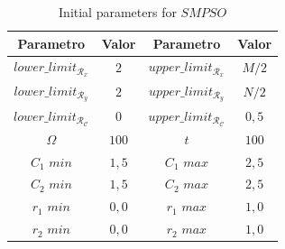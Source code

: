 \documentclass[spanish,twocolumn]{article}
\begin{document}
{%



\begin{table}[h]
\begin{center}
 \begin{tabular}{||c c | c c||} 
 \hline
 Parametro & Valor & Parametro & Valor \\ [0.5ex] 
 \hline\hline
 $lower\_limit_{\mathscr{R}_x}$ & $2$ & $upper\_limit_{\mathscr{R}_x}$ & $M/2$ \\ 
 \hline
 $lower\_limit_{\mathscr{R}_y}$ & $2$ & $upper\_limit_{\mathscr{R}_y}$ & $N/2$ \\  
 \hline
 $lower\_limit_{\mathscr{R}_{\mathscr{C}}}$ & $0$ & $upper\_limit_{\mathscr{R}_{\mathscr{C}}}$ & $0,5$ \\
\hline
$\Omega$ & $100$ & $t$ & $100$ \\ 
\hline
$C_1$ $min$ & $1,5$ & $C_1$ $max$ & $2,5$ \\ 
\hline
$C_2$ $min$ & $1,5$ & $C_2$ $max$ & $2,5$ \\ 
\hline
$r_1$ $min$ & $0,0$ & $r_1$ $max$ & $1,0$ \\ 
\hline
$r_2$ $min$ & $0,0$ & $r_2$ $max$ & $1,0$ \\ [1ex]
\hline
\end{tabular}
\end{center}
\caption[Parámetros de entrada para $SMPSO$]{Initial parameters for $SMPSO$}
\label{table:parametrospso}
\end{table}
 
}
\end{document}
